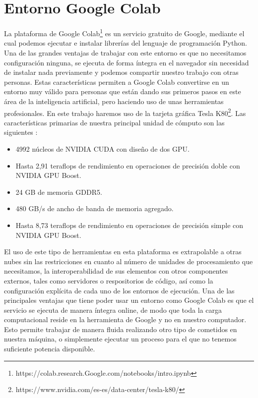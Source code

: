 \section{Entorno Google Colab}\label{sec:entorno-Google-colab}
La plataforma de Google Colab\footnote{https://colab.research.Google.com/notebooks/intro.ipynb} es un servicio gratuito de Google, mediante el cual podemos ejecutar e instalar librerías del lenguaje de programación Python.
Una de las grandes ventajas de trabajar con este entorno es que no necesitamos configuración ninguna, se ejecuta de forma íntegra en el navegador sin necesidad de instalar nada previamente y podemos compartir
nuestro trabajo con otras personas.
Estas características permiten a Google Colab convertirse en un entorno muy válido para personas que están dando sus primeros pasos en este área de la inteligencia artificial, pero haciendo uso
de unas herramientas profesionales.
En este trabajo haremos uso de la tarjeta gráfica Tesla K80\footnote{https://www.nvidia.com/es-es/data-center/tesla-k80/}.
Las características primarias de nuestra principal unidad de cómputo son las siguientes :
\begin{itemize}
    \item 4992 núcleos de NVIDIA CUDA con diseño de dos GPU\@.
    \item Hasta 2,91 teraflops de rendimiento en operaciones de precisión doble con NVIDIA GPU Boost.
    \item 24 GB de memoria GDDR5.
    \item 480 GB/s de ancho de banda de memoria agregado.
    \item Hasta 8,73 teraflops de rendimiento en operaciones de precisión simple con NVIDIA GPU Boost.
\end{itemize}
El uso de este tipo de herramientas en esta plataforma es extrapolable a otras nubes sin las restricciones en cuanto al número de unidades de procesamiento que necesitamos, la interoperabilidad de sus elementos con otros componentes externos, tales como servidores o respositorios de código, así como la configuración explícita de cada uno de los entornos de ejecución.
Una de las principales ventajas que tiene poder usar un entorno como Google Colab es que el servicio se ejecuta de manera íntegra online, de modo que toda la carga computacional reside en la herramienta de Google y no en nuestro computador.
Esto permite trabajar de manera fluida realizando otro tipo de cometidos en nuestra máquina, o simplemente ejecutar un proceso para el que no tenemos suficiente potencia disponible.
